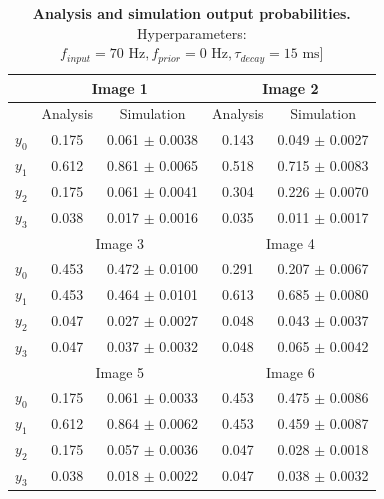 \begin{table}[]
\centering
\label{tab:1D_70_0_15}
\small
\tabcolsep=0.11cm
\begin{tabular}{|c|cc|cc|}
\hline
                       & \multicolumn{2}{c|}{Image 1}                       & \multicolumn{2}{c|}{Image 2}                       \\ \hline
                       & \multicolumn{1}{c|}{Analysis} & Simulation         & \multicolumn{1}{c|}{Analysis} & Simulation         \\ \hline
$y_0$                  & \multicolumn{1}{c|}{0.175}    & 0.061 $\pm$ 0.0038 & \multicolumn{1}{c|}{0.143}    & 0.049 $\pm$ 0.0027 \\ \hline
$y_1$                  & \multicolumn{1}{c|}{0.612}    & 0.861 $\pm$ 0.0065 & \multicolumn{1}{c|}{0.518}    & 0.715 $\pm$ 0.0083 \\ \hline
$y_2$                  & \multicolumn{1}{c|}{0.175}    & 0.061 $\pm$ 0.0041 & \multicolumn{1}{c|}{0.304}    & 0.226 $\pm$ 0.0070 \\ \hline
$y_3$                  & \multicolumn{1}{c|}{0.038}    & 0.017 $\pm$ 0.0016 & \multicolumn{1}{c|}{0.035}    & 0.011 $\pm$ 0.0017 \\ \hline
                       & \multicolumn{2}{c|}{Image 3}                       & \multicolumn{2}{c|}{Image 4}                       \\ \hline
$y_0$                  & \multicolumn{1}{c|}{0.453}    & 0.472 $\pm$ 0.0100 & \multicolumn{1}{c|}{0.291}    & 0.207 $\pm$ 0.0067 \\ \hline
$y_1$                  & \multicolumn{1}{c|}{0.453}    & 0.464 $\pm$ 0.0101 & \multicolumn{1}{c|}{0.613}    & 0.685 $\pm$ 0.0080 \\ \hline
$y_2$                  & \multicolumn{1}{c|}{0.047}    & 0.027 $\pm$ 0.0027 & \multicolumn{1}{c|}{0.048}    & 0.043 $\pm$ 0.0037 \\ \hline
$y_3$                  & \multicolumn{1}{c|}{0.047}    & 0.037 $\pm$ 0.0032 & \multicolumn{1}{c|}{0.048}    & 0.065 $\pm$ 0.0042 \\ \hline
						& \multicolumn{2}{c|}{Image 5}                       & \multicolumn{2}{c|}{Image 6}                       \\ \hline
$y_0$                  & \multicolumn{1}{c|}{0.175}    & 0.061 $\pm$ 0.0033 & \multicolumn{1}{c|}{0.453}    & 0.475 $\pm$ 0.0086 \\ \hline
$y_1$                  & \multicolumn{1}{c|}{0.612}    & 0.864 $\pm$ 0.0062 & \multicolumn{1}{c|}{0.453}    & 0.459 $\pm$ 0.0087 \\ \hline
$y_2$                  & \multicolumn{1}{c|}{0.175}    & 0.057 $\pm$ 0.0036 & \multicolumn{1}{c|}{0.047}    & 0.028 $\pm$ 0.0018 \\ \hline
$y_3$                  & \multicolumn{1}{c|}{0.038}    & 0.018 $\pm$ 0.0022 & \multicolumn{1}{c|}{0.047}    & 0.038 $\pm$ 0.0032 \\ \hline
\end{tabular}
\caption{\textbf{Analysis and simulation output probabilities. } Hyperparameters: $f_{input} = 70\text{ Hz}, f_{prior} = 0\text{ Hz}, \tau_{decay} = 15\text{ ms}]$}
\end{table}

